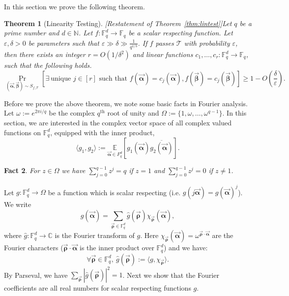 \documentclass[11pt]{article}
\newcommand{\F}{\mathbb{F}}
\renewcommand{\ge}{ \geqslant}
\newtheorem{theorem}{Theorem}[section]
\newtheorem{fact}[theorem]{Fact}
\renewcommand{\epsilon}{\varepsilon}
\newcommand{\alphab}{\vec{\bm{\alpha}}}
\newcommand{\betab}{\vec{\bm{\beta}}}
\newcommand{\rhob}{\vec{\bm{\rho}}}
\begin{document}
In this section we prove the following theorem. 

\begin{theorem}[Linearity Testing][Restatement of Theorem~\ref{thm:lintest}]\label{thm:linearitytest}
Let $q$ be a prime number and $d\in \mathbb{N}$.
Let $f:\F_q^d\to\F_q$ be a scalar respecting function. Let $\epsilon, \delta > 0$ be parameters such that 
$\epsilon \gg \delta \gg \frac{1}{q^{1/3}}$. 
If $f$  passes $\mathcal{T}$ with probability $\varepsilon$, then  there exists an integer $r = O(1/\delta^2)$ and 
\emph{linear} functions $c_1,\ldots ,c_r:\F_q^d\to\F_q$, such that the following holds.
$$
\underset{ (\alphab, \betab) \sim S_{f,\mathcal{T}} }{\Pr}\left[\exists\ \text{unique } j\in[r] \text{ such that }f(\alphab)=c_j(\alphab),
 f(\betab)=c_j(\betab) \right]\ge 1- O\left(\frac{\delta}{\epsilon}\right).
$$
\end{theorem}

Before we prove the above theorem, we note some basic facts in Fourier analysis.  
Let $\omega:=e^{2\pi i/q}$ be the complex $q^{\text{th}}$ root of unity and $\Omega :=\{1,\omega,\ldots,\omega^{q-1}\}$.
In this section, we are interested in the complex vector space of all complex valued functions on $\F_q^d$, equipped with the inner product,
$$
\langle g_1,g_2\rangle:=\underset{\alphab\in F_q^d}{\mathbb{E}}[g_1(\alphab)\overline{g_2(\alphab)}].
$$

\begin{fact}\label{fact}
For  $z\in\Omega$ we have $\sum_{j=0}^{q-1} z^{j}=q$ if $z=1$ and  $\sum_{j=0}^{q-1} z^{j}=0$ if $z\neq 1$.
\end{fact}

Let $g:\F_q^d\to\Omega$ be a function which is scalar respecting (i.e. $g(j \alphab) = g(\alphab)^j$).  We write $$g(\alphab) = \underset{\rhob\in\F_q^d}{\sum}\hat{g}(\rhob)\chi_{\rhob}(\alphab),$$ 
where $\hat{g}:\F_q^d\to \mathbb{C}$ is the Fourier transform of $g$. Here 
$\chi_{\rhob}(\alphab) = \omega^{\rhob \cdot \alphab}$ are the Fourier characters ($\rhob \cdot \alphab$ is the inner product over $\F_q^d$)
 and we have:
$$
\forall \rhob\in\F_q^d,\ \hat{g}(\rhob):= \langle g,\chi_{\rhob}\rangle.
$$
By Parseval, we have $\sum_{\rhob} |\hat{g}(\rhob)|^2 =1$. 
Next we show that the Fourier coefficients are all real numbers for scalar respecting functions $g$. 
\end{document}
